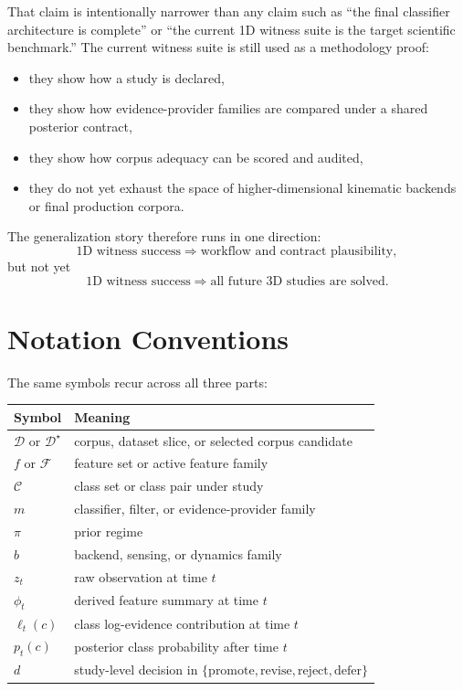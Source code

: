 \documentclass[11pt]{article}
\begin{document}
That claim is intentionally narrower than any claim such as ``the final classifier architecture is complete'' or ``the current 1D witness suite is the target scientific benchmark.'' The current witness suite is still used as a methodology proof:
\begin{itemize}[leftmargin=1.5em]
  \item they show how a study is declared,
  \item they show how evidence-provider families are compared under a shared posterior contract,
  \item they show how corpus adequacy can be scored and audited,
  \item they do not yet exhaust the space of higher-dimensional kinematic backends or final production corpora.
\end{itemize}

The generalization story therefore runs in one direction:
\begin{equation}
\text{1D witness success}
\Longrightarrow
\text{workflow and contract plausibility},
\end{equation}
but not yet
\begin{equation}
\text{1D witness success}
\Longrightarrow
\text{all future 3D studies are solved}.
\end{equation}

\section{Notation Conventions}
The same symbols recur across all three parts:
\begin{center}
\begin{tabularx}{0.92\textwidth}{@{}lX@{}}
\toprule
Symbol & Meaning \\
\midrule
\(\mathcal{D}\) or \(\mathcal{D}^{\star}\) & corpus, dataset slice, or selected corpus candidate \\
\(f\) or \(\mathcal{F}\) & feature set or active feature family \\
\(\mathcal{C}\) & class set or class pair under study \\
\(m\) & classifier, filter, or evidence-provider family \\
\(\pi\) & prior regime \\
\(b\) & backend, sensing, or dynamics family \\
\(z_t\) & raw observation at time \(t\) \\
\(\phi_t\) & derived feature summary at time \(t\) \\
\(\ell_t(c)\) & class log-evidence contribution at time \(t\) \\
\(p_t(c)\) & posterior class probability after time \(t\) \\
\(d\) & study-level decision in \(\{\text{promote}, \text{revise}, \text{reject}, \text{defer}\}\) \\
\bottomrule
\end{tabularx}
\end{center}
\end{document}
